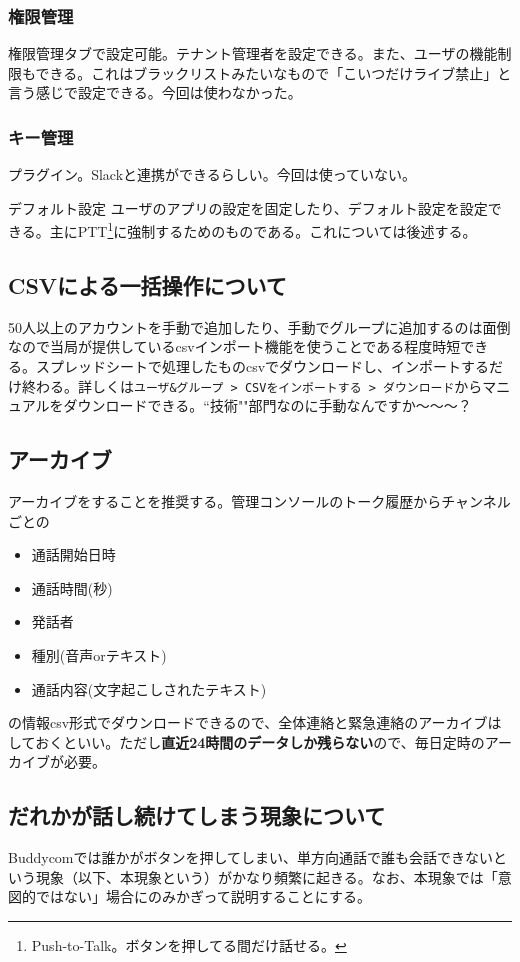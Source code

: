 \documentclass[dvipdfmx,jb5]{jarticle}
\newcommand{\impact}[1]{\textbf{\gtfamily #1}}
\begin{document}
\subsubsection{権限管理}
権限管理タブで設定可能。テナント管理者を設定できる。また、ユーザの機能制限もできる。これはブラックリストみたいなもので「こいつだけライブ禁止」と言う感じで設定できる。今回は使わなかった。

\subsubsection{キー管理}
プラグイン。Slackと連携ができるらしい。今回は使っていない。

{デフォルト設定}
ユーザのアプリの設定を固定したり、デフォルト設定を設定できる。主にPTT\footnote{Push-to-Talk。ボタンを押してる間だけ話せる。}に強制するためのものである。これについては後述する。


\subsection{CSVによる一括操作について}
50人以上のアカウントを手動で追加したり、手動でグループに追加するのは面倒なので当局が提供しているcsvインポート機能を使うことである程度時短できる。スプレッドシートで処理したものcsvでダウンロードし、インポートするだけ終わる。詳しくは\verb|ユーザ&グループ > CSVをインポートする > ダウンロード|からマニュアルをダウンロードできる。``技術""部門なのに手動なんですか〜〜〜？

\subsection{アーカイブ}
アーカイブをすることを推奨する。管理コンソールのトーク履歴からチャンネルごとの
\begin{itemize}
 \item 通話開始日時
 \item 通話時間(秒)
 \item 発話者
 \item 種別(音声orテキスト)
 \item 通話内容(文字起こしされたテキスト)
\end{itemize}
の情報csv形式でダウンロードできるので、全体連絡と緊急連絡のアーカイブはしておくといい。ただし\impact{直近24時間のデータしか残らない}ので、毎日定時のアーカイブが必要。

\subsection{だれかが話し続けてしまう現象について}
Buddycomでは誰かがボタンを押してしまい、単方向通話で誰も会話できないという現象（以下、本現象という）がかなり頻繁に起きる。なお、本現象では「意図的ではない」場合にのみかぎって説明することにする。
\end{document}
